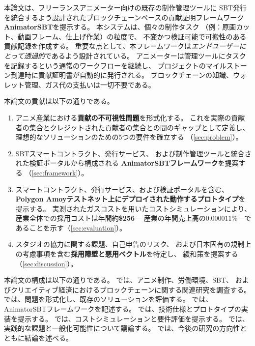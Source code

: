 本論文は、フリーランスアニメーター向けの既存の制作管理ツールに
SBT発行を統合するよう設計されたブロックチェーンベースの貢献証明フレームワーク
\textbf{AnimatorSBT}を提示する。
本システムは、個々の制作タスク
（例：原画カット、動画フレーム、仕上げ作業）の粒度で、
不変かつ検証可能で可搬性のある貢献記録を作成する。
重要な点として、本フレームワークは\textit{エンドユーザーにとって透過的}であるよう設計されている。
アニメーターは管理ツールにタスクを記録するという通常のワークフローを継続し、
プロジェクトのマイルストーン到達時に貢献証明書が自動的に発行される。
ブロックチェーンの知識、ウォレット管理、ガス代の支払いは一切不要である。

本論文の貢献は以下の通りである。

\begin{enumerate}
  \item アニメ産業における\textbf{貢献の不可視性問題}を形式化する。
    これを実際の貢献者の集合とクレジットされた貢献者の集合との間のギャップとして定義し、
    理想的なソリューションのための5つの要件を確立する
    （\cref{sec:problem}）。
  \item SBTスマートコントラクト、発行サービス、
    および制作管理ツールと統合された検証ポータルから構成される
    \textbf{AnimatorSBTフレームワーク}を提案する
    （\cref{sec:framework}）。
  \item スマートコントラクト、発行サービス、および検証ポータルを含む、
    \textbf{Polygon Amoyテストネット上にデプロイされた動作するプロトタイプ}を提示する。
    実測されたガスコストを用いたコストシミュレーションにより、
    産業全体での採用コストは年間約\textbf{\$256}---
    産業の年間売上高の$0.000011\%$---であることを示す（\cref{sec:evaluation}）。
  \item スタジオの協力に関する課題、自己申告のリスク、
    および日本固有の規制上の考慮事項を含む\textbf{採用障壁と悪用ベクトル}を特定し、
    緩和策を提案する（\cref{sec:discussion}）。
\end{enumerate}

本論文の構成は以下の通りである。
では、アニメ制作、労働環境、SBT、
およびクリエイティブ経済におけるブロックチェーンに関する関連研究を調査する。
では、問題を形式化し、既存のソリューションを評価する。
では、AnimatorSBTフレームワークを記述する。
では、技術仕様とプロトタイプの実装を提示する。
では、コストシミュレーションと要件評価を提示する。
では、実践的な課題と一般化可能性について議論する。
では、今後の研究の方向性とともに結論を述べる。
